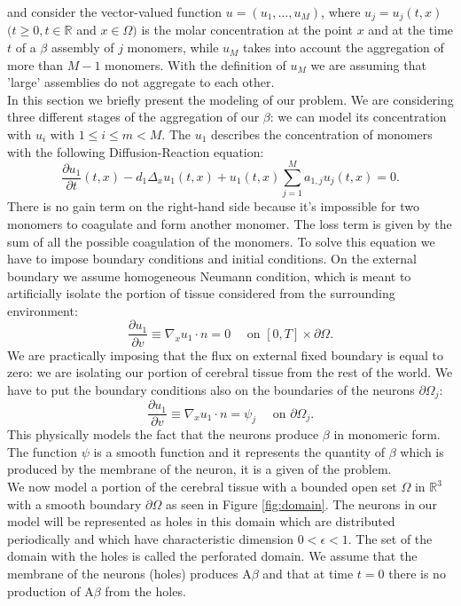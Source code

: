 \noindent and consider the vector-valued function $u=(u_1,\dots, u_M)$, where $u_j=u_j(t,x)$ $(t\geq 0, t\in \mathbb{R}$ and $x\in \Omega)$ is the molar concentration at the point $x$ and at the time $t$ of a \(\beta\) assembly of $j$ monomers, while $u_M$ takes into account the aggregation of more than $M-1$ monomers. With the definition of $u_M$ we are assuming that 'large' assemblies do not aggregate to each other.\\
In this section we briefly present the modeling of our problem. We are considering three different stages of the aggregation of our \(\beta\): we can model its concentration with $u_{i}$ with $1\leq i \leq m < M$.
The $u_{1}$ describes the concentration of monomers with the following Diffusion-Reaction equation: 
$$
\frac{\partial u_{1}}{\partial t}(t, x)-d_{1} \Delta_{x} u_{1}(t, x)+u_{1}(t, x) \sum_{j=1}^{M} a_{1, j} u_{j}(t, x)=0.
$$
There is no gain term on the right-hand side because it's impossible for two monomers to coagulate and form another monomer. The loss term is given by the sum of all the possible coagulation of the monomers. 
To solve this equation we have to impose boundary conditions and initial conditions.
On the external boundary we assume homogeneous Neumann condition, which is meant to artificially isolate the portion of tissue considered from the surrounding environment:
$$
\frac{\partial u_1}{\partial v} \equiv \nabla_{x} u_1\cdot n=0 \quad \text { on }[0, T] \times \partial \Omega.$$
We are practically imposing that the flux on external fixed boundary is equal to zero: we are isolating our portion of cerebral tissue from the rest of the world.
We have to put the boundary conditions also on the boundaries of the neurons $\partial\Omega_{j}$:
$$ 
\frac{\partial u_{1}}{\partial v} \equiv \nabla_{x} u_1 \cdot n= \psi_{j} \quad \text { on } \partial\Omega_{j}.
$$
This physically models the fact that the neurons produce \(\beta\) in monomeric form. The function $\psi$ is a smooth function and it represents the quantity of \(\beta\) which is produced by the membrane of the neuron, it is a given of the problem.\\
We now model a portion of the cerebral tissue with a bounded open set $\Omega$ in $\mathbb{R}^{3}$ with a smooth boundary $\partial \Omega$ as seen in Figure \ref{fig:domain}. The neurons in our model will be represented as holes in this domain which are distributed periodically and which have characteristic dimension $0<\epsilon<1$. The set of the domain with the holes is called the perforated domain.
We assume that the membrane of the neurons (holes) produces $\mathrm{A} \beta$ and that at time $t=0$ there is no production of  $\mathrm{A} \beta$ from the holes. \\
